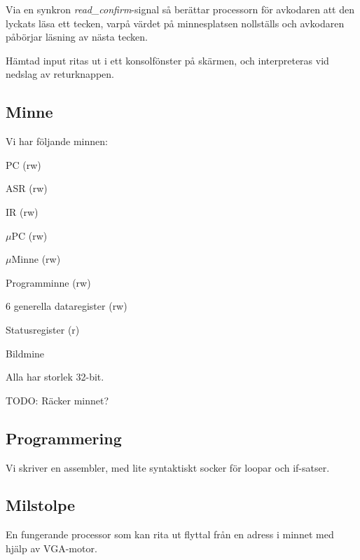 \documentclass[]{article}
\begin{document}
Via en synkron \textit{read\_confirm}-signal så berättar processorn för avkodaren att den lyckats läsa ett tecken, varpå värdet på minnesplatsen nollställs och avkodaren påbörjar läsning av nästa tecken.

Hämtad input ritas ut i ett konsolfönster på skärmen, och interpreteras vid nedslag av returknappen.

\subsection{Minne}
Vi har följande minnen:
\begin{itemize*}
\item PC (rw)
\item ASR (rw)
\item IR (rw)
\item $\mu$PC (rw)
\item $\mu$Minne (rw)
\item Programminne (rw)
\item 6 generella dataregister (rw)
\item Statusregister (r)
\item Bildmine
\end{itemize*}
Alla har storlek 32-bit.

TODO: Räcker minnet?

\subsection{Programmering}
Vi skriver en assembler, med lite syntaktiskt socker för loopar och if-satser. 

\subsection{Milstolpe}
En fungerande processor som kan rita ut flyttal från en adress i minnet med hjälp av VGA-motor.
\end{document}
